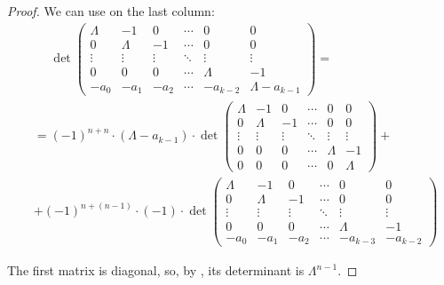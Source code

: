 \begin{proof}
  We can use  on the last column:
  \begin{align*}
    &\phantom{{}={}}
    \det \begin{pmatrix}
      \Lambda & -1      & 0       & \cdots & 0        & 0      \\
      0       & \Lambda & -1      & \cdots & 0        & 0      \\
      \vdots  & \vdots  & \vdots  & \ddots & \vdots   & \vdots \\
      0       & 0       & 0       & \cdots & \Lambda  & -1     \\
      -a_0    & -a_1    & -a_2    & \cdots & -a_{k-2} & \Lambda - a_{k-1}
    \end{pmatrix}
    = \\ &=
    (-1)^{n+n} \cdot (\Lambda - a_{k-1}) \cdot
    \det \begin{pmatrix}
      \Lambda & -1      & 0       & \cdots & 0       & 0      \\
      0       & \Lambda & -1      & \cdots & 0       & 0      \\
      \vdots  & \vdots  & \vdots  & \ddots & \vdots  & \vdots \\
      0       & 0       & 0       & \cdots & \Lambda & -1     \\
      0       & 0       & 0       & \cdots & 0       & \Lambda
    \end{pmatrix}
    + \\ &+
    (-1)^{n+(n-1)} \cdot (-1) \cdot
    \det \begin{pmatrix}
      \Lambda & -1      & 0       & \cdots & 0        & 0      \\
      0       & \Lambda & -1      & \cdots & 0        & 0      \\
      \vdots  & \vdots  & \vdots  & \ddots & \vdots   & \vdots \\
      0       & 0       & 0       & \cdots & \Lambda  & -1     \\
      -a_0    & -a_1    & -a_2    & \cdots & -a_{k-3} & -a_{k-2}
    \end{pmatrix}
  \end{align*}

  The first matrix is diagonal, so, by , its determinant is \( \Lambda^{n-1} \).


\end{proof}
